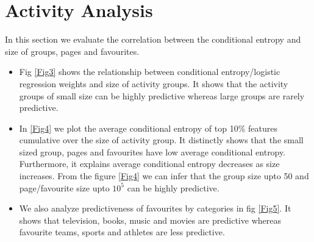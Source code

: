 \section{Activity Analysis}


In this section we evaluate the correlation between the conditional
entropy and size of groups, pages and favourites.
\begin{itemize}
  \item Fig \ref{Fig3} shows the relationship between conditional
    entropy/logistic regression weights and size of activity
    groups. It shows that the activity groups of small size can be
    highly predictive whereas large groups are rarely predictive.
  \item In \ref{Fig4} we plot the average conditional entropy of top
    10\% features cumulative over the size of activity group. It
    distinctly shows that the small sized group, pages and favourites
    have low average conditional entropy. Furthermore, it explains
    average conditional entropy decreases as size increases. From the
    figure \ref{Fig4} we can infer that the group size upto 50 and
    page/favourite size upto $10^{5}$ can be highly predictive.
  \item We also analyze predictiveness of favourites by categories in
    fig \ref{Fig5}. It shows that television, books, music and movies
    are predictive whereas favourite teams, sports and athletes are
    less predictive.
\end{itemize}


